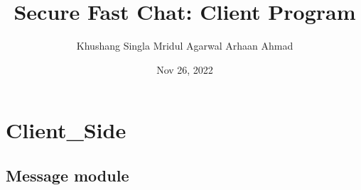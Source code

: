\documentclass[letterpaper,10pt,english]{sphinxmanual}
\title{Secure Fast Chat: Client Program}
\date{Nov 26, 2022}
\author{Khushang Singla	Mridul Agarwal	Arhaan Ahmad}
\begin{document}
\pagestyle{empty}
\sphinxmaketitle
\pagestyle{plain}
\sphinxtableofcontents
\pagestyle{normal}
\label{\detokenize{index::doc}}



\chapter{Client\_Side}
\label{\detokenize{modules:client-side}}\label{\detokenize{modules::doc}}

\section{Message module}
\label{\detokenize{Message:module-Message}}\label{\detokenize{Message:message-module}}\label{\detokenize{Message::doc}}
\end{document}
